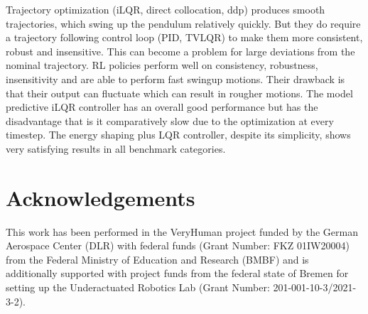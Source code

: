 \documentclass[onecolumn, letter paper]{report}
\begin{document}
Trajectory optimization (iLQR, direct collocation, ddp) produces smooth trajectories, which swing up the pendulum relatively quickly. But they do require a trajectory following control loop (PID, TVLQR) to make them more consistent, robust and insensitive. This can become a problem for large deviations from the nominal trajectory. RL policies perform well on consistency, robustness, insensitivity and are able to perform fast swingup motions. Their drawback is that their output can fluctuate which can result in rougher motions. The model predictive iLQR controller has an overall good performance but has the disadvantage that is it comparatively slow due to the optimization at every timestep. The energy shaping plus LQR controller, despite its simplicity, shows very satisfying results in all benchmark categories.

\chapter*{Acknowledgements}

This work has been performed in the VeryHuman project funded by the German Aerospace Center (DLR) with federal funds (Grant Number: FKZ 01IW20004) from the Federal Ministry of Education and Research (BMBF) and is additionally supported with project funds from the federal state of Bremen for setting up the Underactuated Robotics Lab (Grant Number: 201-001-10-3/2021-3-2).

\printbibliography[heading=bibintoc, title={Bibliography}]
\end{document}

